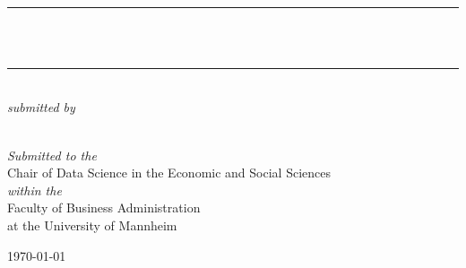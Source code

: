 %
%
%
% 
%


\begin{titlepage} %
\newcommand{\HRule}{\rule{\linewidth}{0.5mm}} %
\center %
\textsc{\LARGE \TypeofThesis}\\[1.5cm] %
\HRule\\[0.4cm]
\linespread{1.7}\selectfont
{\huge\bfseries \TitleofThesis}\\ %
\HRule\\[1.5cm]
\linespread{1.2}\selectfont
    \vfill
    \textit{\large submitted by}\\[0.5cm] %
\textsc{\Large \AuthorofThesis}\\[0.5cm] %
    \vfill

{\large\textit{Submitted to the}}\\
\Large Chair of Data Science in the Economic and Social Sciences \\
    {\large\textit{within the}}\\
    Faculty of Business Administration \\
    at the University of Mannheim
    
\vfill\vfill\vfill %
{\large\today} %


\end{titlepage}
